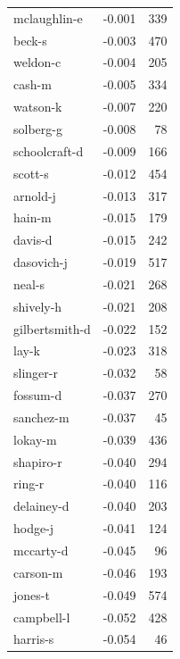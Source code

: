 \documentclass{vldb}
\begin{document}
\begin{appendix}
\begin{supertabular}{ l r r }
mclaughlin-e   &                -0.001 &     339 \\
beck-s         &                -0.003 &     470 \\
weldon-c       &                -0.004 &     205 \\
cash-m         &                -0.005 &     334 \\
watson-k       &                -0.007 &     220 \\
solberg-g      &                -0.008 &      78 \\
schoolcraft-d  &                -0.009 &     166 \\
scott-s        &                -0.012 &     454 \\
arnold-j       &                -0.013 &     317 \\
hain-m         &                -0.015 &     179 \\
davis-d        &                -0.015 &     242 \\
dasovich-j     &                -0.019 &     517 \\
neal-s         &                -0.021 &     268 \\
shively-h      &                -0.021 &     208 \\
gilbertsmith-d &                -0.022 &     152 \\
lay-k          &                -0.023 &     318 \\
slinger-r      &                -0.032 &      58 \\
fossum-d       &                -0.037 &     270 \\
sanchez-m      &                -0.037 &      45 \\
lokay-m        &                -0.039 &     436 \\
shapiro-r      &                -0.040 &     294 \\
ring-r         &                -0.040 &     116 \\
delainey-d     &                -0.040 &     203 \\
hodge-j        &                -0.041 &     124 \\
mccarty-d      &                -0.045 &      96 \\
carson-m       &                -0.046 &     193 \\
jones-t        &                -0.049 &     574 \\
campbell-l     &                -0.052 &     428 \\
harris-s       &                -0.054 &      46 \\

\end{supertabular}
\end{appendix}
\end{document}

